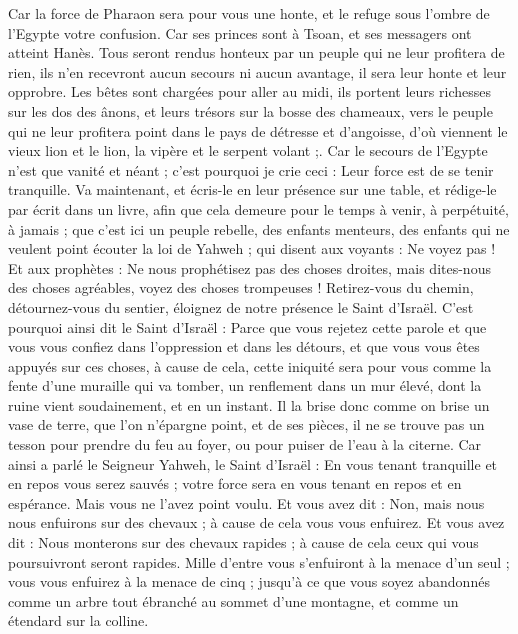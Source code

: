 \begin{multicols}{2}
Car la force de Pharaon sera pour vous une honte, et le refuge sous l'ombre de l'Egypte votre confusion.
Car ses princes sont à Tsoan, et ses messagers ont atteint Hanès.
Tous seront rendus honteux par un peuple qui ne leur profitera de rien, ils n'en recevront aucun secours ni aucun avantage, il sera leur honte et leur opprobre.
Les bêtes sont chargées pour aller au midi, ils portent leurs richesses sur les dos des ânons, et leurs trésors sur la bosse des chameaux, vers le peuple qui ne leur profitera point dans le pays de détresse et d'angoisse, d'où viennent le vieux lion et le lion, la vipère et le serpent volant ;.
Car le secours de l'Egypte n'est que vanité et néant ; c'est pourquoi je crie ceci : Leur force est de se tenir tranquille.
Va maintenant, et écris-le en leur présence sur une table, et rédige-le par écrit dans un livre, afin que cela demeure pour le temps à venir, à perpétuité, à jamais ;
que c'est ici un peuple rebelle, des enfants menteurs, des enfants qui ne veulent point écouter la loi de Yahweh ;
qui disent aux voyants : Ne voyez pas ! Et aux prophètes : Ne nous prophétisez pas des choses droites, mais dites-nous des choses agréables, voyez des choses trompeuses !
Retirez-vous du chemin, détournez-vous du sentier, éloignez de notre présence le Saint d'Israël.
C'est pourquoi ainsi dit le Saint d'Israël : Parce que vous rejetez cette parole et que vous vous confiez dans l'oppression et dans les détours, et que vous vous êtes appuyés sur ces choses,
à cause de cela, cette iniquité sera pour vous comme la fente d'une muraille qui va tomber, un renflement dans un mur élevé, dont la ruine vient soudainement, et en un instant.
Il la brise donc comme on brise un vase de terre, que l'on n'épargne point, et de ses pièces, il ne se trouve pas un tesson pour prendre du feu au foyer, ou pour puiser de l'eau à la citerne.
Car ainsi a parlé le Seigneur Yahweh, le Saint d'Israël : En vous tenant tranquille et en repos vous serez sauvés ; votre force sera en vous tenant en repos et en espérance. Mais vous ne l'avez point voulu.
Et vous avez dit : Non, mais nous nous enfuirons sur des chevaux ; à cause de cela vous vous enfuirez. Et vous avez dit : Nous monterons sur des chevaux rapides ; à cause de cela ceux qui vous poursuivront seront rapides.
Mille d'entre vous s'enfuiront à la menace d'un seul ; vous vous enfuirez à la menace de cinq ; jusqu'à ce que vous soyez abandonnés comme un arbre tout ébranché au sommet d'une montagne, et comme un étendard sur la colline.

\end{multicols}
